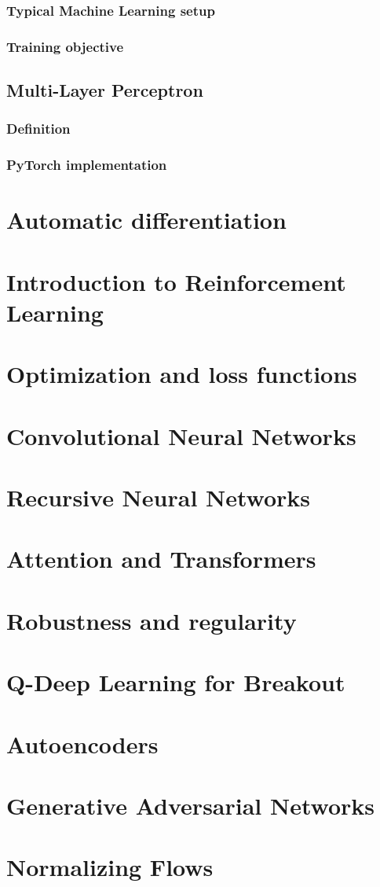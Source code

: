 \documentclass[toc, titlepaged]{../cs-classes/cs-classes}
\begin{document}
\subsubsection{Typical Machine Learning setup}
\subsubsection{Training objective}

\subsection{Multi-Layer Perceptron}
\subsubsection{Definition}
\subsubsection{PyTorch implementation}

\section{Automatic differentiation}

\section{Introduction to Reinforcement Learning}

\section{Optimization and loss functions}

\section{Convolutional Neural Networks}

\section{Recursive Neural Networks}

\section{Attention and Transformers}

\section{Robustness and regularity}

\section{Q-Deep Learning for Breakout}

\section{Autoencoders}

\section{Generative Adversarial Networks}

\section{Normalizing Flows}
\end{document}
